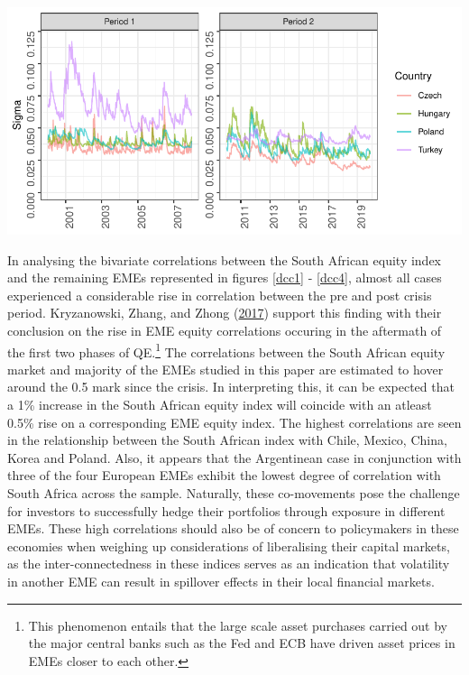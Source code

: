 \documentclass[11pt,preprint, authoryear]{elsarticle}
\let\origfigure\figure
\let\endorigfigure\endfigure
\renewenvironment{figure}[1][2] {
    \expandafter\origfigure\expandafter[H]
} {
    \endorigfigure
}
\numberwithin{equation}{section}
\numberwithin{figure}{section}
\numberwithin{table}{section}
\let\rmarkdownfootnote\footnote%
\def\footnote{\protect\rmarkdownfootnote}
\begin{document}
\begin{figure}[H]

{\centering \includegraphics{Template_files/figure-latex/vol4-1} 

}

\caption{Europe Conditional Volatility \label{vol.europe}}\label{fig:vol4}
\end{figure}

In analysing the bivariate correlations between the South African equity
index and the remaining EMEs represented in figures \ref{dcc1} -
\ref{dcc4}, almost all cases experienced a considerable rise in
correlation between the pre and post crisis period. Kryzanowski, Zhang,
and Zhong (\protect\hyperlink{ref-kryzanowski2017cross}{2017}) support
this finding with their conclusion on the rise in EME equity
correlations occuring in the aftermath of the first two phases of
QE.\footnote{This phenomenon entails that the large scale asset
  purchases carried out by the major central banks such as the Fed and
  ECB have driven asset prices in EMEs closer to each other.} The
correlations between the South African equity market and majority of the
EMEs studied in this paper are estimated to hover around the 0.5 mark
since the crisis. In interpreting this, it can be expected that a 1\%
increase in the South African equity index will coincide with an atleast
0.5\% rise on a corresponding EME equity index. The highest correlations
are seen in the relationship between the South African index with Chile,
Mexico, China, Korea and Poland. Also, it appears that the Argentinean
case in conjunction with three of the four European EMEs exhibit the
lowest degree of correlation with South Africa across the sample.
Naturally, these co-movements pose the challenge for investors to
successfully hedge their portfolios through exposure in different EMEs.
These high correlations should also be of concern to policymakers in
these economies when weighing up considerations of liberalising their
capital markets, as the inter-connectedness in these indices serves as
an indication that volatility in another EME can result in spillover
effects in their local financial markets.
\end{document}
